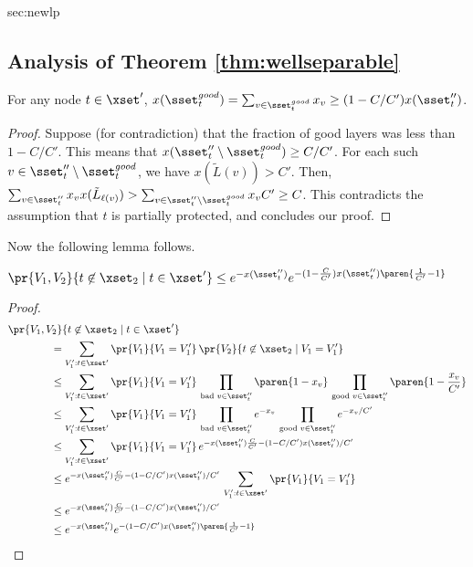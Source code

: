 \begin{appendixextra}{sec:newlp}{\subsection{Analysis of Theorem \ref{thm:wellseparable}}}
\begin{claim}
For any node $t \in \xset'$, $x(\sset^{good}_t) =  \sum_{v \in \sset^{good}_t} x_{v} \geq (1-C/C') x(\sset''_t)$. 
\end{claim}

\begin{proof}
Suppose (for contradiction) that the fraction of good layers was less than $1-C/C'$. This means that $x(\sset''_t \setminus \sset^{good}_t) \geq C/C'$.
For each such $v \in \sset''_t \setminus \sset^{good}_t$, we have $x(\tilde L(v)) > C'$.  
Then,
$\sum_{v \in \sset''_t} x_v x(\tilde L_{\ell(v)}) > \sum_{v\in \sset''_t \setminus \sset^{good}_t} x_v C' \geq C$. 
This contradicts the assumption that $t$ is partially protected, and concludes our proof.
\end{proof}

Now the following lemma follows.  

\newcommand{\qqqq}{\quad\quad\quad\quad}
\begin{lemma}
\label{lem:partial}  
$\pr{V_1, V_2}{t \not \in \xset_2 \mid t \in \xset'} \leq  e^{-x(\sset''_t)} e^{-(1-\frac{C}{C'}) x(\sset''_t) \paren{\frac{1}{C'}-1}}$ 
\end{lemma}

\begin{proof} 
\begin{align*}
&\pr{V_1, V_2}{t \not \in \xset_2 \mid t \in \xset'} \\
&\qqqq=    \sum_{V^\prime_1: t \in \xset'} \pr{V_1}{V_1 = V^\prime_1}\,\pr{V_2}{t \not \in \xset_2 \mid V_1 = V^\prime_1} \\
&\qqqq\leq \sum_{V^\prime_1: t \in \xset'} \pr{V_1}{V_1 = V^\prime_1}\,
          \prod_{\text{bad }v \in \sset''_t}\paren{1-x_{v}}\,
          \prod_{\text{good }v \in \sset''_t}\paren{1-\frac{x_{v}}{C'}} \\
&\qqqq\leq \sum_{V^\prime_1: t \in \xset'} \pr{V_1}{V_1 = V^\prime_1}\,
          \prod_{\text{bad } v \in \sset''_t} e^{-x_{v}}\,
          \prod_{\text{good }v \in \sset''_t} e^{-x_{v}/C'} \\
&\qqqq\leq \sum_{V^\prime_1: t \in \xset'} \pr{V_1}{V_1 = V^\prime_1}\,
          e^{-x(\sset''_t)\frac{C}{C'} - (1-C/C') x(\sset''_t) / C'} \\
&\qqqq\leq e^{-x(\sset''_t)\frac{C}{C'} - (1-C/C')x(\sset''_t) / C'}\,
          \sum_{V^\prime_1: t \in \xset'} \pr{V_1}{V_1 = V^\prime_1} \\
&\qqqq\leq e^{-x(\sset''_t)\frac{C}{C'} - (1-C/C') x(\sset''_t) / C'} \\
&\qqqq\leq e^{-x(\sset''_t)} e^{-(1-C/C') x(\sset''_t) \paren{\frac1{C'}-1}}
\end{align*}
\end{proof} 
 

\end{appendixextra}
